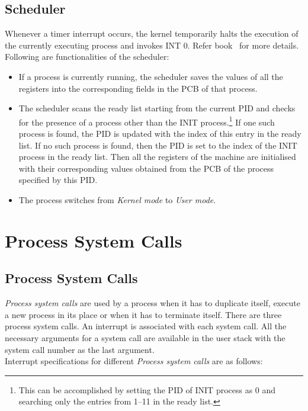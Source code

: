 \documentclass[10pt]{report}
\newcounter{syscall}
\begin{document}
\section{Scheduler}
\label{chp:scheduler}
Whenever a timer interrupt occurs, the kernel temporarily halts the execution of the currently executing process and invokes INT 0.
Refer book~\cite{Crowley} for more details.
Following are functionalities of the scheduler:
\begin{itemize}
	\item If a process is currently running, the scheduler saves the values of all the registers into the corresponding fields in the PCB of that process.
	\item The scheduler scans the ready list starting from the current PID and checks for the presence of a process other than the INIT process.\footnote{This can be accomplished by setting the PID of INIT process as 0 and searching only the entries from 1--11 in the ready list.} If one such process is found, the PID is updated with the index of this entry in the ready list. If no such process is found, then the PID is set to the index of the INIT process in the ready list. Then all the registers of the machine are initialised with their corresponding values obtained from the PCB of the process specified by this PID.
	\item The process switches from \textit{Kernel mode} to \textit{User mode}.
\end{itemize}

\chapter{Process System Calls}
\label{chp:process_system_calls}

\section{Process System Calls}
\label{procsyscall}
\textit{Process system calls} are used by a process when it has to duplicate itself, execute a new process in its place or when it has to terminate itself. There are three process system calls. An interrupt is associated with each system call. All the necessary arguments for a system call are available in the user stack with the system call number as the last argument.\\

\noindent Interrupt specifications for different \textit{Process system calls} are as follows:
\end{document}
